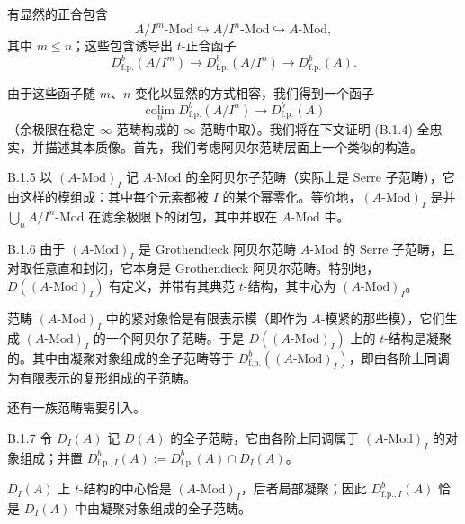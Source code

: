 有显然的正合包含
\begin{equation}\tag{B.1.3}\label{eq:a4-18-2}
A/I^m\text{-}\mathrm{Mod}\hookrightarrow A/I^n\text{-}\mathrm{Mod}\hookrightarrow A\text{-}\mathrm{Mod},
\end{equation}
其中 $m\le n$；这些包含诱导出 $t$-正合函子
\[
D^b_{\mathrm{f.p.}}(A/I^m)\to D^b_{\mathrm{f.p.}}(A/I^n)\to D^b_{\mathrm{f.p.}}(A).
\]

由于这些函子随 $m$、$n$ 变化以显然的方式相容，我们得到一个函子
\begin{equation}\tag{B.1.4}\label{eq:a4-18-3}
\operatorname*{colim}_n D^b_{\mathrm{f.p.}}(A/I^n)\to D^b_{\mathrm{f.p.}}(A)
\end{equation}
（余极限在稳定 $\infty$-范畴构成的 $\infty$-范畴中取）。我们将在下文证明 (B.1.4) 全忠实，并描述其本质像。首先，我们考虑阿贝尔范畴层面上一个类似的构造。

\begin{defn}{B.1.5}\label{thm:a4-18-15}
以 $(A\text{-}\mathrm{Mod})_I$ 记 $A$-$\mathrm{Mod}$ 的全阿贝尔子范畴（实际上是 Serre 子范畴），它由这样的模组成：其中每个元素都被 $I$ 的某个幂零化。等价地，$(A\text{-}\mathrm{Mod})_I$ 是并 $\bigcup_n A/I^n\text{-}\mathrm{Mod}$ 在滤余极限下的闭包，其中并取在 $A$-$\mathrm{Mod}$ 中。
\end{defn}

\begin{rem}{B.1.6}\label{thm:a4-18-16}
由于 $(A\text{-}\mathrm{Mod})_I$ 是 Grothendieck 阿贝尔范畴 $A$-$\mathrm{Mod}$ 的 Serre 子范畴，且对取任意直和封闭，它本身是 Grothendieck 阿贝尔范畴。特别地，$D((A\text{-}\mathrm{Mod})_I)$ 有定义，并带有其典范 $t$-结构，其中心为 $(A\text{-}\mathrm{Mod})_I$。

范畴 $(A\text{-}\mathrm{Mod})_I$ 中的紧对象恰是有限表示模（即作为 $A$-模紧的那些模），它们生成 $(A\text{-}\mathrm{Mod})_I$ 的一个阿贝尔子范畴。于是 $D((A\text{-}\mathrm{Mod})_I)$ 上的 $t$-结构是凝聚的。其中由凝聚对象组成的全子范畴等于 $D^b_{\mathrm{f.p.}}((A\text{-}\mathrm{Mod})_I)$，即由各阶上同调为有限表示的复形组成的子范畴。
\end{rem}

还有一族范畴需要引入。

\begin{defn}{B.1.7}\label{thm:a4-18-17}
令 $D_I(A)$ 记 $D(A)$ 的全子范畴，它由各阶上同调属于 $(A\text{-}\mathrm{Mod})_I$ 的对象组成；并置 $D^b_{\mathrm{f.p.},I}(A):=D^b_{\mathrm{f.p.}}(A)\cap D_I(A)$。
\end{defn}

$D_I(A)$ 上 $t$-结构的中心恰是 $(A\text{-}\mathrm{Mod})_I$，后者局部凝聚；因此 $D^b_{\mathrm{f.p.},I}(A)$ 恰是 $D_I(A)$ 中由凝聚对象组成的全子范畴。

